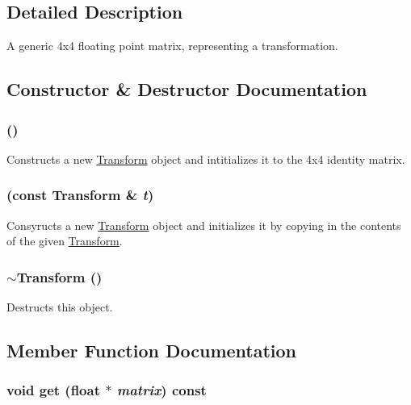 \subsection{Detailed Description}
A generic 4x4 floating point matrix, representing a transformation. 

\subsection{Constructor \& Destructor Documentation}
\hypertarget{classm3g_1_1Transform_9de68ec1c9b7809129814a3233ae4655}{
\subsubsection[{Transform}]{ ()}}
\label{classm3g_1_1Transform_9de68ec1c9b7809129814a3233ae4655}


Constructs a new \hyperlink{classm3g_1_1Transform}{Transform} object and intitializes it to the 4x4 identity matrix. \hypertarget{classm3g_1_1Transform_6f8c18ec2bd6b5c0d7f3472752ec79d1}{
\subsubsection[{Transform}]{ (const {\bf Transform} \& {\em t})}}
\label{classm3g_1_1Transform_6f8c18ec2bd6b5c0d7f3472752ec79d1}


Consyructs a new \hyperlink{classm3g_1_1Transform}{Transform} object and initializes it by copying in the contents of the given \hyperlink{classm3g_1_1Transform}{Transform}. \hypertarget{classm3g_1_1Transform_8e627263611a76aad02c9e0b89287c68}{
\subsubsection[{$\sim$Transform}]{\setlength{\rightskip}{0pt plus 5cm}$\sim${\bf Transform} ()}}
\label{classm3g_1_1Transform_8e627263611a76aad02c9e0b89287c68}


Destructs this object. 

\subsection{Member Function Documentation}
\hypertarget{classm3g_1_1Transform_f78faf7dcc06f53604ad08965babb7b3}{
\subsubsection[{get}]{\setlength{\rightskip}{0pt plus 5cm}void get (float $\ast$ {\em matrix}) const}}
\label{classm3g_1_1Transform_f78faf7dcc06f53604ad08965babb7b3}


